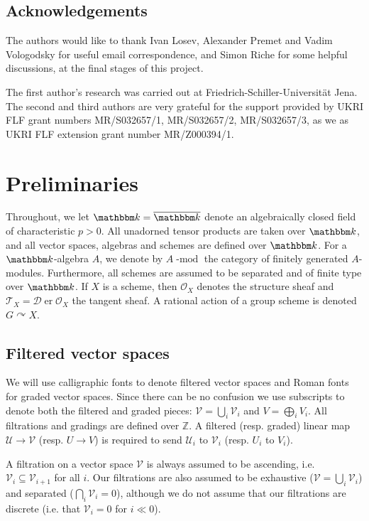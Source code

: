 \documentclass[twoside,12pt,reqno]{amsart}
\theoremstyle{remark}
\numberwithin{equation}{section}
\def\k{{\mathbbm k}}
\def\lmod{\!\operatorname{-mod}}
\def\Dersh{\D\!\operatorname{er}}
\def\Z{{\mathbb Z}}
\def\U{\mathcal{U}}
\def\D{\mathcal{D}}
\def\Oc{\mathcal{O}}
\def\T{\mathcal{T}}
\def\V{\mathcal{V}}
\begin{document}
\subsection*{Acknowledgements} The authors would like to thank Ivan Losev, Alexander Premet and Vadim Vologodsky for useful email correspondence, and Simon Riche for some helpful discussions, at the final stages of this project.

The first author's research was carried out at Friedrich-Schiller-Universität Jena. The second and third authors are very grateful for the support provided by UKRI FLF grant numbers MR/S032657/1, MR/S032657/2, MR/S032657/3, as we as UKRI FLF extension grant number MR/Z000394/1.

  \tableofcontents
 
 \section{Preliminaries}\label{ss:Prelims}
 
Throughout, we let $\k = \overline{\k}$ denote an algebraically closed field of characteristic $p > 0$. All unadorned tensor products are taken over $\k$, and all vector spaces, algebras and schemes are defined over $\k$. For a $\k$-algebra $A$, we denote by $A\lmod$ the category of finitely generated $A$-modules.      Furthermore,  all schemes are assumed to be separated and of finite type over $\k$. If $X$ is a scheme, then $\Oc_X$ denotes the structure sheaf and $\T_X = \Dersh \Oc_X$ the tangent sheaf. A rational action of a group scheme is denoted $G \curvearrowright X$.

 
 
 \subsection{Filtered vector spaces}
 \label{ss:filteredgradedspaces}
We will use calligraphic fonts to denote filtered vector spaces and Roman fonts for graded vector spaces. Since there can be no confusion we use subscripts to denote both the filtered and graded pieces: $\V = \bigcup_{i} \V_i$ and $V = \bigoplus_i V_i$. All filtrations and gradings are defined over $\Z$. A filtered (resp. graded) linear map $\U\to \V$ (resp. $U\to V$) is required to send $\U_i$ to $\V_i$ (resp. $U_i$ to $V_i$).

A filtration on a vector space $\V$ is always assumed to be ascending, i.e. $\V_i \subseteq \V_{i+1}$ for all $i$. Our filtrations are also assumed to be exhaustive ($\V = \bigcup_i \V_i$) and separated ($\bigcap_i \V_i = 0$), although we do not assume that our filtrations are discrete (i.e. that  $\V_i = 0$ for $i \ll 0$).
\end{document}
